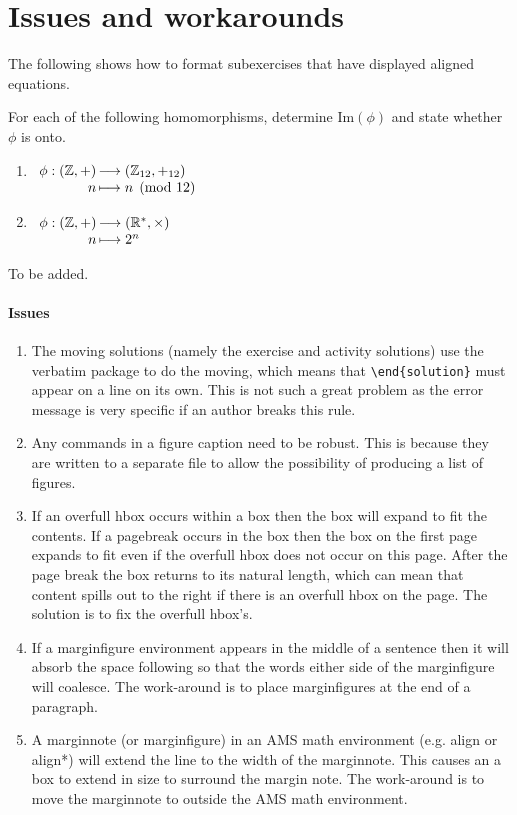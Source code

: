 \documentclass[solutionsatend]{ouunit}
\begin{document}
\section{Issues and workarounds}
The following shows how to format subexercises that have displayed aligned equations.
\begin{exercise}
For each of the following homomorphisms, determine \(\mathrm{Im}(\phi)\) and state whether \(\phi\) is onto.
\begin{enumerate}
\item \(\begin{array}[t]{r@{\,}l}
\phi:(\mathbb{Z},+)&\longrightarrow (\mathbb{Z}_{12},+_{12})\\
  n&\longmapsto n\pmod{12}
  \end{array}\)
\item \(\begin{array}[t]{r@{\,}l}
\phi:(\mathbb{Z},+)&\longrightarrow (\mathbb{R}^*,\times)\\
  n&\longmapsto 2^n
  \end{array}\)
\end{enumerate}
\begin{solution}
To be added.
\end{solution}
\end{exercise}


\paragraph{Issues}
\begin{enumerate}
\item
The moving solutions (namely the exercise and activity solutions) use the verbatim package to do the moving, which means that \verb”\end{solution}” must appear on a line on its own. This is not such a great problem as the error message is very specific if an author breaks this rule.
\item
Any commands in a figure caption need to be robust. This is because they are written to a separate file to allow the possibility of producing a list of figures.
\item
If an overfull hbox occurs within a box then the box will expand to fit the contents. If a pagebreak occurs in the box then the box on the first page expands to fit even if the overfull hbox does not occur on this page. After the page break the box returns to its natural length, which can mean that content spills out to the right if there is an overfull hbox on the page. The solution is to fix the overfull hbox's.
\item
If a marginfigure environment appears in the middle of a sentence then it will absorb the space following so that the words either side of the marginfigure will coalesce. The work-around is to place marginfigures at the end of a paragraph.
\item
A marginnote (or marginfigure) in an AMS math environment (e.g. align or align*) will extend the line to the width of the marginnote. This causes an a box to extend in size to surround the margin note. The work-around is to move the marginnote to outside the AMS math environment.
\end{enumerate}
\end{document}
